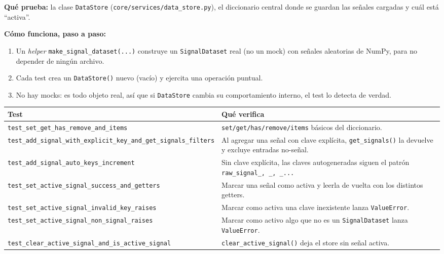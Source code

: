 \documentclass[11pt,a4paper]{article}
\begin{document}
\textbf{Qué prueba:} la clase \texttt{DataStore} (\texttt{core/services/data\_\allowbreak store.py}), el diccionario
central donde se guardan las señales cargadas y cuál está ``activa''.

\textbf{Cómo funciona, paso a paso:}
\begin{enumerate}
  \item Un \textit{helper} \texttt{make\_\allowbreak signal\_\allowbreak dataset(...)} construye un \texttt{SignalDataset} real
        (no un mock) con señales aleatorias de NumPy, para no depender de ningún archivo.
  \item Cada test crea un \texttt{DataStore()} nuevo (vacío) y ejercita una operación puntual.
  \item No hay mocks: es todo objeto real, así que si \texttt{DataStore} cambia su comportamiento interno,
        el test lo detecta de verdad.
\end{enumerate}

\begin{center}
\begin{longtable}{L{5.5cm}L{9cm}}
\toprule
\textbf{Test} & \textbf{Qué verifica} \\
\midrule
\endhead
\texttt{test\_\allowbreak set\_\allowbreak get\_\allowbreak has\_\allowbreak remove\_\allowbreak and\_\allowbreak items} & \texttt{set/get/has/remove/items} básicos del diccionario. \\
\texttt{test\_\allowbreak add\_\allowbreak signal\_\allowbreak with\_\allowbreak explicit\_\allowbreak key\_\allowbreak and\_\allowbreak get\_\allowbreak signals\_\allowbreak filters} & Al agregar una señal con clave explícita, \texttt{get\_\allowbreak signals()} la devuelve y excluye entradas no-señal. \\
\texttt{test\_\allowbreak add\_\allowbreak signal\_\allowbreak auto\_\allowbreak keys\_\allowbreak increment} & Sin clave explícita, las claves autogeneradas siguen el patrón \texttt{raw\_\allowbreak signal\_, \_, \_...} \\
\texttt{test\_\allowbreak set\_\allowbreak active\_\allowbreak signal\_\allowbreak success\_\allowbreak and\_\allowbreak getters} & Marcar una señal como activa y leerla de vuelta con los distintos getters. \\
\texttt{test\_\allowbreak set\_\allowbreak active\_\allowbreak signal\_\allowbreak invalid\_\allowbreak key\_\allowbreak raises} & Marcar como activa una clave inexistente lanza \texttt{ValueError}. \\
\texttt{test\_\allowbreak set\_\allowbreak active\_\allowbreak signal\_\allowbreak non\_\allowbreak signal\_\allowbreak raises} & Marcar como activo algo que no es un \texttt{SignalDataset} lanza \texttt{ValueError}. \\
\texttt{test\_\allowbreak clear\_\allowbreak active\_\allowbreak signal\_\allowbreak and\_\allowbreak is\_\allowbreak active\_\allowbreak signal} & \texttt{clear\_\allowbreak active\_\allowbreak signal()} deja el store sin señal activa. \\
\bottomrule
\end{longtable}
\end{center}
\end{document}
